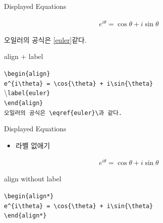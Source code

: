 \documentclass[12pt]{gshs_lecture}
\newcommand{\tb}{\textbackslash}
\newenvironment{codeblock}[1]{
	\begin{block}{#1}
		\setstretch{1.0}
		\begin{small}
}{
		\end{small}
	\end{block}
}
\begin{document}
\begin{frame}[t]{Displayed Equations}
	
	\begin{align}
	e^{i\theta} = \cos{\theta} + i\sin{\theta}
	\label{euler}
	\end{align}
	
	\begin{center}
		오일러의 공식은 \eqref{euler}\과 같다.
	\end{center}
	
	\begin{codeblock}{align + label}
		\texttt{\tb begin\{align\}}\\
		\hspace{6mm} \texttt{e\^{}\{i\tb theta\} = \tb cos\{\tb theta\} + i\tb sin\{\tb theta\}}\\
		\hspace{6mm} \tb \texttt{label\{euler\}} \\
		\texttt{\tb end\{align\}} \\		
		\texttt{오일러의 공식은 \tb eqref\{euler\}\tb 과 같다.}
	\end{codeblock}
	
\end{frame}

\begin{frame}[t]{Displayed Equations}
	
	\begin{itemize}
		\item 라벨 없애기
	\end{itemize}
	
	\begin{align*}
	e^{i\theta} = \cos{\theta} + i\sin{\theta}
	\end{align*}
	
	\begin{codeblock}{align without label}
		\texttt{\tb begin\{align*\}}\\
		\hspace{6mm} \texttt{e\^{}\{i\tb theta\} = \tb cos\{\tb theta\} + i\tb sin\{\tb theta\}}\\
		\texttt{\tb end\{align*\}} \\
	\end{codeblock}

\end{frame}
\end{document}
